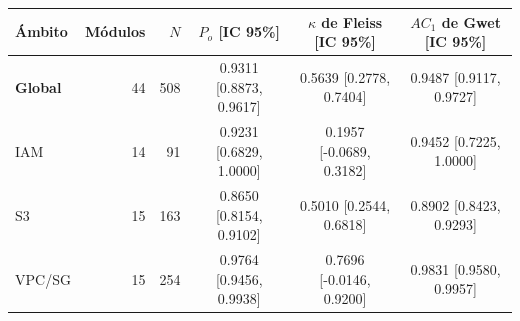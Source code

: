 \begin{tabular}{lrrccc}
\toprule
Ámbito & Módulos & $N$ & $P_o$ [IC 95\%] & $\kappa$ de Fleiss [IC 95\%] & $AC_1$ de Gwet [IC 95\%] \\
\midrule
\textbf{Global} & 44 & 508 & 0.9311 [0.8873, 0.9617] & 0.5639 [0.2778, 0.7404] & 0.9487 [0.9117, 0.9727] \\
IAM & 14 & 91 & 0.9231 [0.6829, 1.0000] & 0.1957 [-0.0689, 0.3182] & 0.9452 [0.7225, 1.0000] \\
S3 & 15 & 163 & 0.8650 [0.8154, 0.9102] & 0.5010 [0.2544, 0.6818] & 0.8902 [0.8423, 0.9293] \\
VPC/SG & 15 & 254 & 0.9764 [0.9456, 0.9938] & 0.7696 [-0.0146, 0.9200] & 0.9831 [0.9580, 0.9957] \\
\bottomrule
\end{tabular}
